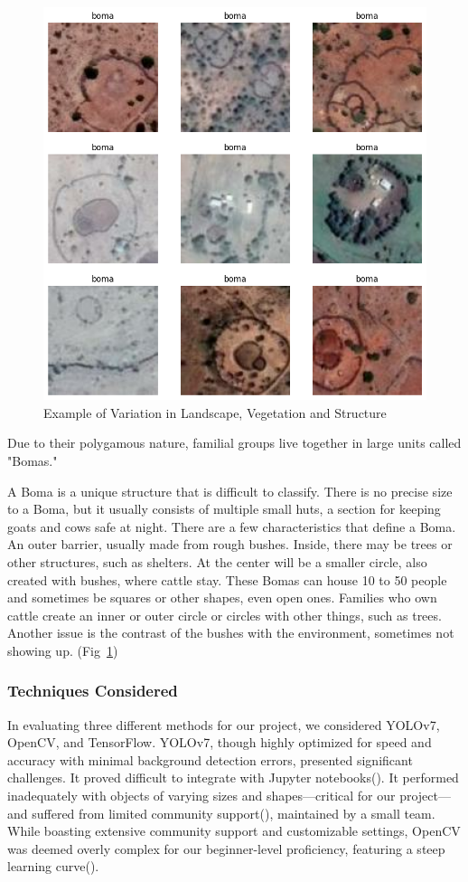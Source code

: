 \documentclass[10pt]{article}
\begin{document}
\begin{figure} [H]
    \centering
    \includegraphics[width=0.8\linewidth]{images/types of bomas.png}
    \caption{Example of Variation in Landscape, Vegetation and Structure}
    \label{fig:types_of_bomas}
\end{figure}

Due to their polygamous nature, familial groups live together in large units called "Bomas." 

A Boma is a unique structure that is difficult to classify. There is no precise size to a Boma, but it usually consists of multiple small huts, a section for keeping goats and cows safe at night. There are a few characteristics that define a Boma. An outer barrier, usually made from rough bushes. Inside, there may be trees or other structures, such as shelters. At the center will be a smaller circle, also created with bushes, where cattle stay. These Bomas can house 10 to 50 people and sometimes be squares or other shapes, even open ones. Families who own cattle create an inner or outer circle or circles with other things, such as trees. Another issue is the contrast of the bushes with the environment, sometimes not showing up. (Fig~\ref{fig:types_of_bomas})


\subsubsection{Techniques Considered}

In evaluating three different methods for our project, we considered YOLOv7, OpenCV, and TensorFlow. YOLOv7, though highly optimized for speed and accuracy with minimal background detection errors, presented significant challenges. It proved difficult to integrate with Jupyter notebooks(\autocite{s23135849}). It performed inadequately with objects of varying sizes and shapes—critical for our project—and suffered from limited community support(\autocite{IJERTV10IS060287}), maintained by a small team. While boasting extensive community support and customizable settings, OpenCV was deemed overly complex for our beginner-level proficiency, featuring a steep learning curve(\autocite{9174593}).
\end{document}
